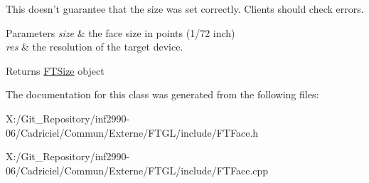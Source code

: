 This doesn't guarantee that the size was set correctly. Clients should check errors.


\begin{DoxyParams}{Parameters}
{\em size} & the face size in points (1/72 inch) \\
\hline
{\em res} & the resolution of the target device. \\
\hline
\end{DoxyParams}
\begin{DoxyReturn}{Returns}
{\ttfamily \hyperlink{class_f_t_size}{F\-T\-Size}} object 
\end{DoxyReturn}


The documentation for this class was generated from the following files\-:\begin{DoxyCompactItemize}
\item 
X\-:/\-Git\-\_\-\-Repository/inf2990-\/06/\-Cadriciel/\-Commun/\-Externe/\-F\-T\-G\-L/include/F\-T\-Face.\-h\item 
X\-:/\-Git\-\_\-\-Repository/inf2990-\/06/\-Cadriciel/\-Commun/\-Externe/\-F\-T\-G\-L/include/F\-T\-Face.\-cpp\end{DoxyCompactItemize}
